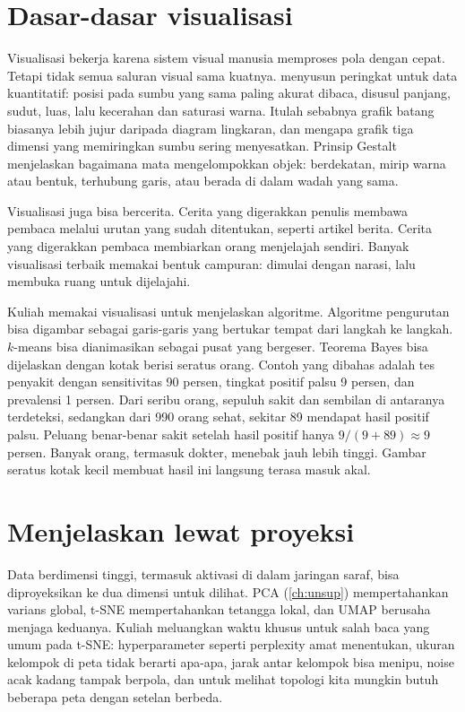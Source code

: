 \section{Dasar-dasar visualisasi}

Visualisasi bekerja karena sistem visual manusia memproses pola dengan cepat. Tetapi tidak
semua saluran visual sama kuatnya. \citet{munzner2014} menyusun peringkat untuk data kuantitatif:
posisi pada sumbu yang sama paling akurat dibaca, disusul panjang, sudut, luas, lalu kecerahan dan
saturasi warna. Itulah sebabnya grafik batang biasanya lebih jujur daripada diagram lingkaran, dan
mengapa grafik tiga dimensi yang memiringkan sumbu sering menyesatkan. Prinsip Gestalt menjelaskan
bagaimana mata mengelompokkan objek: berdekatan, mirip warna atau bentuk, terhubung garis, atau
berada di dalam wadah yang sama.

Visualisasi juga bisa bercerita. Cerita yang digerakkan penulis membawa pembaca melalui urutan yang
sudah ditentukan, seperti artikel berita. Cerita yang digerakkan pembaca membiarkan orang menjelajah
sendiri. Banyak visualisasi terbaik memakai bentuk campuran: dimulai dengan narasi, lalu membuka
ruang untuk dijelajahi.

Kuliah memakai visualisasi untuk menjelaskan algoritme. Algoritme pengurutan bisa digambar sebagai
garis-garis yang bertukar tempat dari langkah ke langkah. $k$-means bisa dianimasikan sebagai pusat
yang bergeser. Teorema Bayes bisa dijelaskan dengan kotak berisi seratus orang. Contoh yang dibahas
adalah tes penyakit dengan sensitivitas 90 persen, tingkat positif palsu 9 persen, dan prevalensi 1
persen. Dari seribu orang, sepuluh sakit dan sembilan di antaranya terdeteksi, sedangkan dari 990
orang sehat, sekitar 89 mendapat hasil positif palsu. Peluang benar-benar sakit setelah hasil positif
hanya $9/(9+89)\approx9$ persen. Banyak orang, termasuk dokter, menebak jauh lebih tinggi. Gambar
seratus kotak kecil membuat hasil ini langsung terasa masuk akal.

\section{Menjelaskan lewat proyeksi}

Data berdimensi tinggi, termasuk aktivasi di dalam jaringan saraf, bisa diproyeksikan ke dua dimensi
untuk dilihat. PCA (\cref{ch:unsup}) mempertahankan varians global, t-SNE \citep{vandermaaten2008} mempertahankan tetangga
lokal, dan UMAP \citep{mcinnes2018} berusaha menjaga keduanya. Kuliah meluangkan waktu khusus untuk
salah baca yang umum pada t-SNE: hyperparameter seperti perplexity amat menentukan, ukuran kelompok
di peta tidak berarti apa-apa, jarak antar kelompok bisa menipu, noise acak kadang tampak berpola,
dan untuk melihat topologi kita mungkin butuh beberapa peta dengan setelan berbeda.

